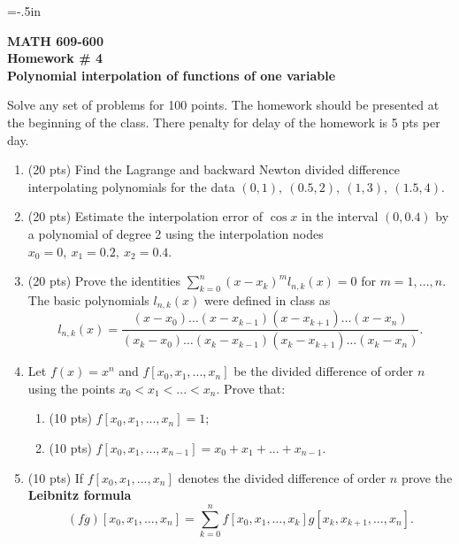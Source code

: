 

\topmargin=-.5in
\textheight=9in
\oddsidemargin=0.2in
\textwidth=6.0in
\pagestyle{empty}

\begin{center}
{\bf MATH 609-600 \\
Homework \# 4 \\
Polynomial interpolation of functions of one variable }
\end{center}

\def\R{{\mathcal R}}

\bigskip
\noindent
Solve any set of problems for 100 points. 
The homework should be presented at the beginning of the class.
There penalty for delay of the homework is 5 pts per day.

\bigskip
\noindent
\begin{enumerate} 

\bigskip
\item (20 pts) Find the Lagrange and backward Newton divided difference
interpolating polynomials for the data $(0,1),~(0.5, 2),~(1, 3),~(1.5, 4)$.


\bigskip
\item (20 pts) Estimate the interpolation error of $\cos x$
in the interval $(0, 0.4)$ by a polynomial of degree 2 using the 
interpolation nodes $x_0=0,~x_1=0.2,~x_2=0.4$.

\bigskip
\item (20 pts) Prove the identities $\sum_{k=0}^{n}(x-x_k)^m l_{n,k} (x) =0$ for $m=1,...,n$. The basic polynomials $ l_{n,k} (x)$ were defined in class as
$$
l_{n,k} (x) = \frac{(x-x_0) \dots (x-x_{k-1})(x-x_{k+1}) \dots (x-x_n)}{(x_k-x_0) \dots (x_k-x_{k-1})(x_k-x_{k+1}) \dots (x_k-x_n)}.
$$ 

\item  Let $f(x)=x^n $ and $f[x_0,x_1,...,x_n]$ be the divided
difference of order $n$ using the points $x_0 < x_1 <... < x_n$. Prove that:
\begin{enumerate}
\item (10 pts) $f[x_0,x_1,...,x_n]=1$; 
\item (10 pts) $f[x_0,x_1,...,x_{n-1}]=x_0 +x_1 + ... + x_{n-1}$.
\end{enumerate}


\bigskip
\item (10 pts) If $f[x_0,x_1, \dots, x_n]$ denotes the divided difference
of order $n$ prove the {\bf Leibnitz formula}
$$(fg)[x_0,x_1, \dots, x_n]= 
\sum_{k=0}^n f[x_0,x_1, \dots, x_k]g[x_k,x_{k+1}, \dots, x_n].$$




\end{enumerate}
